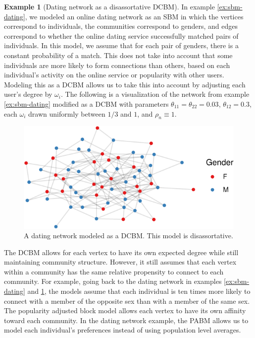\documentclass[
  12pt,
]{article}
\theoremstyle{definition}
\theoremstyle{definition}
\newtheorem{example}{Example}[section]
\theoremstyle{definition}
\theoremstyle{definition}
\theoremstyle{remark}
\begin{document}
\begin{example}[Dating network as a disassortative DCBM]
\label{ex:dcbm-dating}
In example \ref{ex:sbm-dating}, we modeled an online dating network as an SBM in which the vertices correspond to individuals, the communities correspond to genders, and edges correspond to whether the online dating service successfully matched pairs of individuals. 
In this model, we assume that for each pair of genders, there is a constant probability of a match. 
This does not take into account that some individuals are more likely to form connections than others, based on each individual's activity on the online service or popularity with other users. 
Modeling this as a DCBM allows us to take this into account by adjusting each user's degree by $\omega_i$. 
The following is a visualization of the network from example \ref{ex:sbm-dating} modified as a DCBM with parameters $\theta_{11} = \theta_{22} = 0.03$, $\theta_{12} = 0.3$, each $\omega_i$ drawn uniformly between $1/3$ and $1$, and $\rho_n \equiv 1$. 

\begin{figure}[H]

{\centering \includegraphics{draft_files/figure-latex/dating-dcbm-1} 

}

\caption{A dating network modeled as a DCBM. This model is disassortative.}\label{fig:dating-dcbm}
\end{figure}
\end{example}

The DCBM allows for each vertex to have its own expected degree while still maintaining community structure.
However, it still assumes that each vertex within a community has the same relative propensity to connect to each community.
For example, going back to the dating network in examples \ref{ex:sbm-dating} and \ref{ex:dcbm-dating}, the models assume that each individual is ten times more likely to connect with a member of the opposite sex than with a member of the same sex.
The popularity adjusted block model \citep{307cbeb9b1be48299388437423d94bf1} allows each vertex to have its own affinity toward each community.
In the dating network example, the PABM allows us to model each individual's preferences instead of using population level averages.
\end{document}
